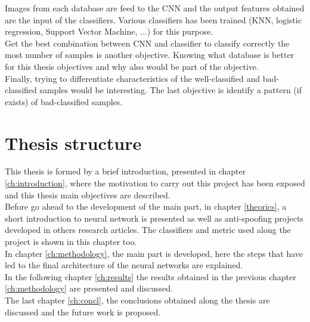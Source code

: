 Images from each database are feed to the CNN and the output features obtained are the input of the classifiers. Various classifiers has been trained (KNN, logistic regression, Support Vector Machine, ...) for this purpose.\\

Get the best combination between CNN and classifier to classify correctly the most number of samples is another objective. Knowing what database is better for this thesis objectives and why also would be part of the objective.\\

Finally, trying to differentiate characteristics of the well-classified and bad-classified samples would be interesting. The last objective is identify a pattern (if exists) of bad-classified samples.\\

\section{Thesis structure}
This thesis is formed by a brief introduction, presented in chapter \ref{ch:introduction}, where the motivation to carry out this project has been exposed and this thesis main objectives are described.\\

Before go ahead to the development of the main part, in chapter \ref{theorics}, a short introduction to neural network is presented as well as anti-spoofing projects developed in others research articles. The classifiers and metric used along the project is shown in this chapter too.\\

In chapter \ref{ch:methodology}, the main part is developed, here the steps that have led to the final architecture of the neural networks are explained.\\

In the following chapter \ref{ch:results} the results obtained in the previous chapter \ref{ch:methodology} are presented and discussed.\\

The last chapter \ref{ch:concl}, the conclusions obtained along the thesis are discussed and the future work is proposed.\\
